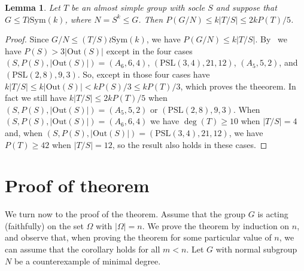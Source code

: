 \documentclass[12pt,a4paper]{article}
\newcommand{\Out}{\mathrm{Out}}
\newcommand{\Sym}{\mathrm{Sym}}
\newcommand{\PSL}{\mathrm{PSL}}
\newtheorem{lemma}[theorem]{Lemma} %
\begin{document}
\begin{lemma}\label{lem:minwpquot}
Let $T$ be an almost simple group with socle $S$ and suppose that
$G \le T \wr \Sym(k)$, where $N = S^k \le G$.
Then $P(G/N) \le k|T/S| \le 2kP(T)/5$.
\end{lemma}
\begin{proof} Since $G/N \le (T/S) \wr \Sym(k)$, we have $P(G/N) \le k|T/S|$.
By~\cite[Lemma 4]{HT} we have $P(S) > 3|\Out(S)|$ except in the four
cases $(S,P(S),|\Out(S)|) = (A_6,6,4)$, $(\PSL(3,4),21,12)$, $(A_5,5,2)$, and
$(\PSL(2,8),9,3)$.  So, except in those four cases have
$k|T/S| \le k|\Out(S)| < kP(S)/3 \le kP(T)/3$, which proves the theeorem.
In fact we still have $k|T/S| \le 2kP(T)/5$ when \linebreak
$(S,P(S),|\Out(S)|)  = (A_5,5,2)$ or $(\PSL(2,8),9,3)$.
When $(S,P(S),|\Out(S)|) = (A_6,6,4)$ we have $\deg(T) \ge 10$ when $|T/S|=4$
and, when $(S,P(S),|\Out(S)|)  = (\PSL(3,4),21,12)$, we have
$P(T) \ge 42$ when $|T/S| =12$, so the result also holds in these cases.
\end{proof} 

\section{Proof of theorem}
We turn now to the proof of the theorem.  Assume that the group $G$ is acting
(faithfully) on the set $\Omega$ with $|\Omega|=n$.  We prove the theorem by
induction on $n$, and observe that, when proving the theorem for some
particular value of $n$, we can assume that the corollary holds for all $m < n$.
Let $G$ with normal subgroup $N$ be a counterexample of minimal degree.
\end{document}
